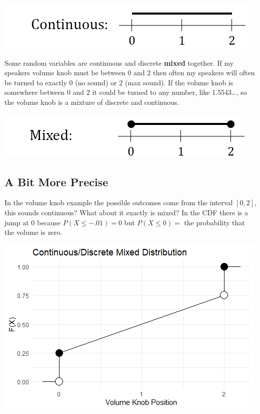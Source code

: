 \documentclass[
]{book}
\theoremstyle{definition}
\theoremstyle{definition}
\theoremstyle{definition}
\theoremstyle{remark}
\begin{document}
\includegraphics{Pictures/04-RV/continuous.PNG}

Some random variables are continuous and discrete \textbf{mixed} together. If my speakers volume knob must be between \(0\) and \(2\) then often my speakers will often be turned to exactly \(0\) (no sound) or \(2\) (max sound). If the volume knob is somewhere between \(0\) and \(2\) it could be turned to any number, like 1.5543\ldots, so the volume knob is a mixture of discrete and continuous.

\includegraphics{Pictures/04-RV/mixed.PNG}

\hypertarget{a-bit-more-precise}{%
\subsection{A Bit More Precise}\label{a-bit-more-precise}}

In the volume knob example the possible outcomes come from the interval \([0,2]\), this sounds continuous? What about it exactly is mixed? In the CDF there is a jump at \(0\) because \(P(X \leq -.01)=0\) but \(P(X \leq 0) =\) the probability that the volume is zero.

\includegraphics{Pictures/04-RV/mixedplot.PNG}
\end{document}
